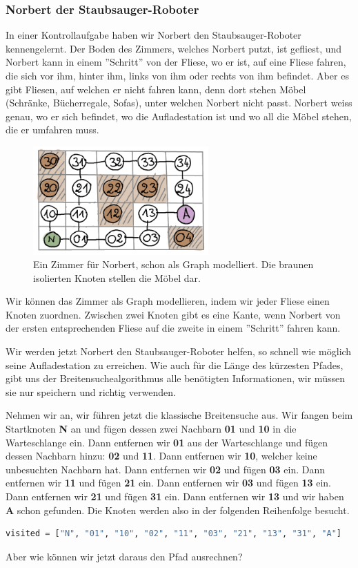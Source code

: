 \subsubsection*{Norbert der Staubsauger-Roboter}
In einer Kontrollaufgabe haben wir Norbert den Staubsauger-Roboter kennengelernt. Der Boden des Zimmers, welches Norbert putzt, ist gefliest, und Norbert kann in einem ''Schritt'' von der Fliese, wo er ist, auf eine Fliese fahren, die sich vor ihm, hinter ihm, links von ihm oder rechts von ihm befindet. Aber es gibt Fliesen, auf welchen er nicht fahren kann, denn dort stehen Möbel (Schränke, Bücherregale, Sofas), unter welchen Norbert nicht passt. Norbert weiss genau, wo er sich befindet, wo die Aufladestation ist und wo all die Möbel stehen, die er umfahren muss.
\begin{figure}[H]
    \centering
    \includegraphics[width=0.6\textwidth]{Pictures/SP/norbert_klein_graph.png}
    \caption{Ein Zimmer für Norbert, schon als Graph modelliert. Die braunen isolierten Knoten stellen die Möbel dar.}
    \label{fig:norbert_klein_graph}
\end{figure}
Wir können das Zimmer als Graph modellieren, indem wir jeder Fliese einen Knoten zuordnen. Zwischen zwei Knoten gibt es eine Kante, wenn Norbert von der ersten entsprechenden Fliese auf die zweite in einem ''Schritt'' fahren kann.

Wir werden jetzt Norbert den Staubsauger-Roboter helfen, so schnell wie möglich seine Aufladestation zu erreichen. Wie auch für die Länge des kürzesten Pfades, gibt uns der Breitensuchealgorithmus alle benötigten Informationen, wir müssen sie nur speichern und richtig verwenden.

Nehmen wir an, wir führen jetzt die klassische Breitensuche aus. Wir fangen beim Startknoten \textbf{N} an und fügen dessen zwei Nachbarn \textbf{01} und \textbf{10} in die Warteschlange ein. Dann entfernen wir \textbf{01} aus der Warteschlange und fügen dessen Nachbarn hinzu: \textbf{02} und \textbf{11}. Dann entfernen wir \textbf{10}, welcher keine unbesuchten Nachbarn hat. Dann entfernen wir \textbf{02} und fügen \textbf{03} ein. Dann entfernen wir \textbf{11} und fügen \textbf{21} ein. Dann entfernen wir \textbf{03} und fügen \textbf{13} ein. Dann entfernen wir \textbf{21} und fügen \textbf{31} ein. Dann entfernen wir \textbf{13} und wir haben \textbf{A} schon gefunden. Die Knoten werden also in der folgenden Reihenfolge besucht.
\begin{lstlisting}[language=Python]
visited = ["N", "01", "10", "02", "11", "03", "21", "13", "31", "A"]
\end{lstlisting}
Aber wie können wir jetzt daraus den Pfad ausrechnen?


